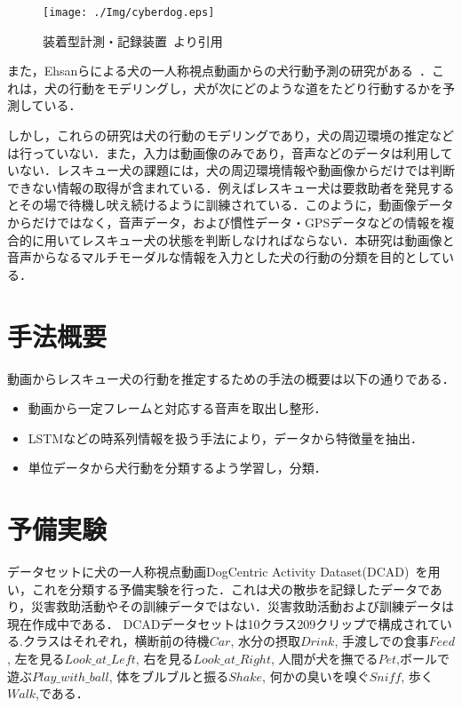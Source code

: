 \documentclass[twocolumn, a4paper]{UECIEresume}
\begin{document}
\begin{figure}[htbp]
 \begin{center}
  \texttt{[image: ./Img/cyberdog.eps]}
  \caption{装着型計測・記録装置~\cite{dog01}より引用}
  \label{cyber}
 \end{center}
\end{figure}

また，Ehsanらによる犬の一人称視点動画からの犬行動予測の研究がある~\cite{whoretthedog}．これは，犬の行動をモデリングし，犬が次にどのような道をたどり行動するかを予測している．

しかし，これらの研究は犬の行動のモデリングであり，犬の周辺環境の推定などは行っていない．また，入力は動画像のみであり，音声などのデータは利用していない．レスキュー犬の課題には，犬の周辺環境情報や動画像からだけでは判断できない情報の取得が含まれている．例えばレスキュー犬は要救助者を発見するとその場で待機し吠え続けるように訓練されている．このように，動画像データからだけではなく，音声データ，および慣性データ・GPSデータなどの情報を複合的に用いてレスキュー犬の状態を判断しなければならない．本研究は動画像と音声からなるマルチモーダルな情報を入力とした犬の行動の分類を目的としている． 

\section{手法概要}
動画からレスキュー犬の行動を推定するための手法の概要は以下の通りである．
\begin{itemize}
 \item 動画から一定フレームと対応する音声を取出し整形．
 \item LSTMなどの時系列情報を扱う手法により，データから特徴量を抽出．
 \item 単位データから犬行動を分類するよう学習し，分類．
\end{itemize}

\section{予備実験}
データセットに犬の一人称視点動画DogCentric Activity Dataset(DCAD)~\cite{yumi2014first}を用い，これを分類する予備実験を行った．これは犬の散歩を記録したデータであり，災害救助活動やその訓練データではない．災害救助活動および訓練データは現在作成中である．
DCADデータセットは10クラス209クリップで構成されている.クラスはそれぞれ，横断前の待機\(Car\), 水分の摂取\(Drink\), 手渡しでの食事\(Feed\), 左を見る\(Look\_at\_Left\), 右を見る\(Look\_at\_Right\), 人間が犬を撫でる\(Pet\),ボールで遊ぶ\(Play\_with\_ball\), 体をブルブルと振る\(Shake\), 何かの臭いを嗅ぐ\(Sniff\), 歩く\(Walk\),である．
\end{document}
